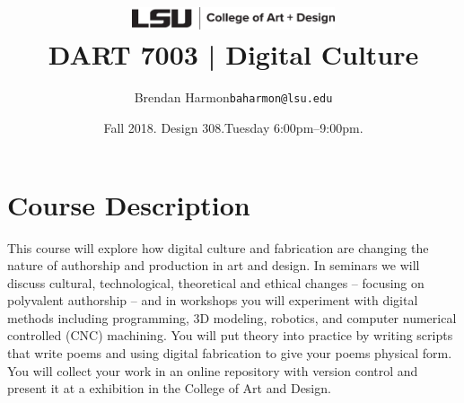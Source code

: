 \documentclass[11pt,article,oneside]{memoir}
\makeatletter
\def\myauthor{Author}
\def\mytitle{Title}
\def\myemail{baharmon@lsu.edu}
\def\myauthor{Brendan Harmon}
\def\mytitle{ \includegraphics[width=6cm]{../images/logos/lsu_art_design_logo.pdf} \\[0.1cm] {\normalfont \normalsize DART 7003 |} \Large Digital Culture}
\newcommand{\globalcolor}[1]{%
  \color{#1}\global\let\default@color\current@color
}
\makeatother
\begin{document}
\setlength\bibitemsep{0.75em}

\setmainfont[Scale=1, Path = fonts/lato/,BoldItalicFont=Lato-RegIta,BoldFont=Lato-Reg,ItalicFont=Lato-LigIta]{Lato-Lig}
\setsansfont[Scale=1, Path = fonts/lato/,BoldItalicFont=Lato-RegIta,BoldFont=Lato-Reg,ItalicFont=Lato-LigIta]{Lato-Lig}
\setmonofont[Mapping=tex-text,Scale=0.8,Path = fonts/inconsolata/]{i}

\def\ind{\hangindent=1 true cm\hangafter=1 \noindent}
\def\labelitemi{$\cdot$}

\title{\LARGE \mytitle}
\author{\Large\myauthor \newline \footnotesize\texttt{\noindent\myemail}}
\date{Fall 2018. Design 308.\newline Tuesday 6:00pm--9:00pm.}
\published{\,}


\globalcolor{black}
\vspace*{-10em}
\maketitle
{} 
\clearpage


\globalcolor{black}

\vspace*{-10em}
\maketitle

\section{Course Description}
%
This course will explore 
how digital culture and fabrication
are changing the nature of authorship
and production in art and design.
%
In seminars we will discuss
cultural, technological, theoretical and ethical changes
-- focusing on polyvalent authorship -- 
and in workshops you will experiment 
with digital methods
including programming, 3D modeling, robotics,
and computer numerical controlled (CNC) machining.
%
You will put theory into practice
by writing scripts that write poems 
and using digital fabrication
to give your poems physical form.
You will collect your work 
in an online repository with version control
and present it at a exhibition
in the College of Art and Design.\\
\end{document}
